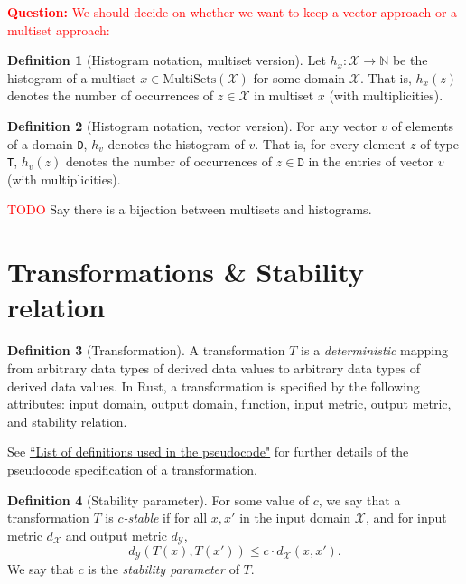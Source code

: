 \documentclass[11pt,a4paper]{article}
\theoremstyle{definition}
\newtheorem{definition}{Definition}[section]
\newcommand{\MultiSet}{\mathrm{MultiSets}}
\newcommand{\X}{\mathcal{X}}
\newcommand{\Y}{\mathcal{Y}}
\newcommand{\questionc}[1]{\textcolor{red}{\textbf{Question:} #1}}
\newcommand{\silvia}[1]{{ {\color{blue}{(silvia)~#1}}}}
\newcommand{\todo}{{\textcolor{red}{TODO }}}
\begin{document}
\questionc{We should decide on whether we want to keep a vector approach or a multiset approach:}
\begin{definition}[Histogram notation, multiset version]
\label{defn:histogram}
    Let $h_x: \mathcal{X} \rightarrow \mathbb{N}$ be the histogram of a multiset $x \in \MultiSet(\mathcal{X} )$ for some domain $\mathcal{X}$. That is, $h_x(z)$ denotes the number of occurrences of $z \in \mathcal{X}$ in multiset $x$ (with multiplicities).
\end{definition}


\begin{definition}[Histogram notation, vector version]
    For any vector $v$ of elements of a domain \texttt{D}, $h_v$ denotes the histogram of $v$. That is, for every element $z$ of type \texttt{T}, $h_v(z)$ denotes the number of occurrences of $z \in \texttt{D}$ in the entries of vector $v$ (with multiplicities).
\end{definition}

\todo{Say there is a bijection between multisets and histograms.}


\section{Transformations \& Stability relation}
\begin{definition}[Transformation]
    A transformation $T$ is a \textit{deterministic} mapping from arbitrary data types of derived data values to arbitrary data types of derived data values. In Rust, a transformation is specified by the following attributes: input domain, output domain, function, input metric, output metric, and stability relation. 
\end{definition}

See \href{https://www.overleaf.com/project/60d215bf90b337ac02200a99}{``List of definitions used in the pseudocode"} for further details of the pseudocode specification of a transformation.

\begin{definition}[Stability parameter]\label{def:c}
    For some value of $c$, we say that a transformation $T$ is $c$\textit{-stable} if for all $x, x'$ in the input domain $\X$, and for input metric $d_{\X}$ and output metric $d_{\Y}$,
    \begin{equation}
        d_{\mathcal{Y}}(T(x), T(x')) \leq c \cdot d_{\mathcal{X}}(x, x').
    \end{equation}
    We say that $c$ is the \textit{stability parameter} of $T$.
\end{definition}
\end{document}

